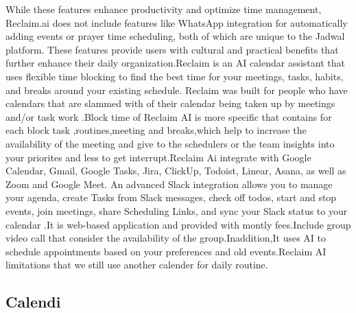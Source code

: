 \documentclass[12pt,a4paper]{report}
\begin{document}
While these features enhance productivity and optimize time management, Reclaim.ai does not include features like WhatsApp integration for automatically adding events or prayer time scheduling, both of which are unique to the Jadwal platform. These features provide users with cultural and practical benefits that further enhance their daily organization.Reclaim is an AI calendar assistant that uses flexible time blocking to find the best time for your meetings, tasks, habits, and breaks around your existing schedule. Reclaim was built for people who have calendars that are slammed with of their calendar being taken up by meetings and/or task work \cite{reclaim}.Block time of Reclaim AI is more specific that contains for each block task ,routines,meeting and breaks,which help to increase the availability of the meeting and give to the schedulers or the team insights into your priorites and less to get interrupt.Reclaim Ai integrate with  Google Calendar, Gmail, Google Tasks, Jira, ClickUp, Todoist, Linear, Asana, as well as Zoom and Google Meet. An advanced Slack integration allows you to manage your agenda, create Tasks from Slack messages, check off todos, start and stop events, join meetings, share Scheduling Links, and sync your Slack status to your calendar \cite{reclaim}.It is web-based application and provided with montly fees.Include group video call that consider the availability of the group.Inaddition,It uses AI to schedule appointments based on your preferences and old events.Reclaim AI limitations that we still use another calender for daily routine.

\subsection{Calendi}
\end{document}
